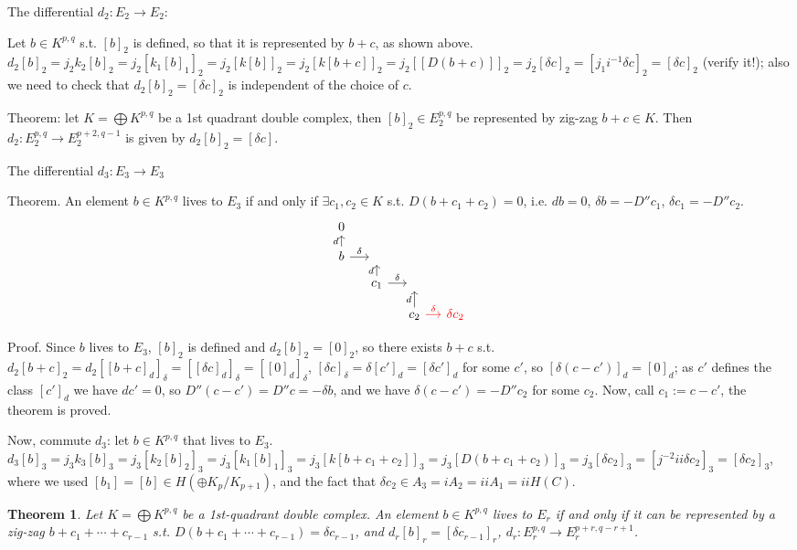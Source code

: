 \documentclass{article}
\theoremstyle{mystyle}
\newtheorem*{theorem*}{Theorem}
\theoremstyle{remark}
\numberwithin{equation}{section}
\begin{document}
The differential $d_2\colon E_2\rightarrow E_2$:

Let $b\in K^{p,q}$ s.t. $[b]_2$ is defined, so that it is represented by $b+c$, as shown above. $d_2[b]_2 = j_2k_2[b]_2 = j_2 [k_1[b]_1]_2 = j_2[k[b]]_2 = j_2[k[b+c]]_2 = j_2[[D(b+c)]]_2 = j_2[\delta c]_2 = [j_1i^{-1}\delta c]_2 = [\delta c]_2$ (verify it!); also we need to check that $d_2[b]_2 = [\delta c]_2$ is independent of the choice of $c$.

Theorem: let $K = \bigoplus K^{p,q}$ be a 1st quadrant double complex, then $[b]_2 \in E_2^{p,q}$ be represented by zig-zag $b+c\in K$. Then $d_2\colon E_2^{p,q}\rightarrow E_2^{p+2,q-1}$ is given by $d_2[b]_2 = [\delta c]$. 

The differential $d_3\colon E_3\rightarrow E_3$

Theorem. An element $b\in K^{p,q}$ lives to $E_3$ if and only if $\exists c_1,c_2 \in K$ s.t. $D(b+c_1+c_2) =0$, i.e. $db=0$, $\delta b = -D''c_1$, $\delta c_1 = -D''c_2$.
$$
\begin{tikzcd}[column sep = small, row sep = small] 0&&&\\b\ar[u,"d"]\ar[r,"\delta"]&~&&\\&c_1\ar[u,"d"]\ar[r,"\delta"]&~&\\
&&c_2\ar[u,"d"]\ar[r,red,"\delta"]&\color{red}{\delta c_2}
\end{tikzcd}
$$

Proof. Since $b$ lives to $E_3$, $[b]_2$ is defined and $d_2[b]_2 = [0]_2$, so there exists $b+c$ s.t. $d_2[b+c]_2 = d_2[[b+c]_d]_\delta
=[[\delta c]_d]_\delta = [[0]_d]_\delta$, $[\delta c]_\delta = \delta[c']_d = [\delta c']_d$ for some $c'$, so $[\delta(c-c')]_d = [0]_d$; as $c'$ defines the class $[c']_d$ we have $dc'=0$, so $D''(c-c')=D''c = -\delta b$, and we have $\delta(c-c')=-D''c_2$ for some $c_2$. Now, call $c_1:=c-c'$,  the theorem is proved. 

Now, commute $d_3$: let $b\in K^{p,q}$ that lives to $E_3$. $d_3[b]_3 = j_3k_3[b]_3 = j_3[k_2[b]_2]_3 = j_3[k_1[b]_1]_3 = j_3 [k[b+c_1+c_2]]_3 = j_3[D(b+c_1+c_2)]_3 = j_3 [ \delta c_2]_3 = [j^{-2} ii\delta c_2]_3 = [\delta c_2]_3$, where we used $[b_1]=[b]\in H(\oplus K_p/K_{p+1})$, and the fact that $\delta c_2 \in A_3 = iA_2 = iiA_1 = iiH(C)$. 

\begin{theorem*} Let $K = \bigoplus K^{p,q}$ be a 1st-quadrant double complex. An element $b\in K^{p,q}$ lives to $E_r$ if and only if it can be represented by a zig-zag $b+c_1+\cdots +c_{r-1}$ s.t. $D(b+c_1+\cdots+c_{r-1}) = \delta c_{r-1}$, and $d_r[b]_r = [\delta c_{r-1}]_r$, $d_r\colon E^{p,q}_r \rightarrow E^{p+r,q-r+1}_r$. 
\end{theorem*}
\end{document}
